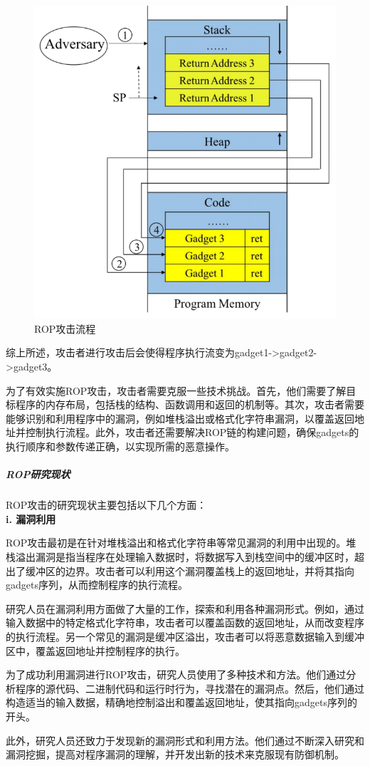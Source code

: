 \documentclass[UTF8,12pt,a4paper]{ctexart}
\numberwithin{figure}{section}
\begin{document}
\begin{figure}
    \centering
    \includegraphics[scale=0.35]{graph/ROP.png}
    \caption{ROP攻击流程}
    \label{ROP}
\end{figure}
综上所述，攻击者进行攻击后会使得程序执行流变为gadget1->gadget2->gadget3。

\par 为了有效实施ROP攻击，攻击者需要克服一些技术挑战。首先，他们需要了解目标程序的内存布局，包括栈的结构、函数调用和返回的机制等。其次，攻击者需要能够识别和利用程序中的漏洞，例如堆栈溢出或格式化字符串漏洞，以覆盖返回地址并控制执行流程。此外，攻击者还需要解决ROP链的构建问题，确保gadgets的执行顺序和参数传递正确，以实现所需的恶意操作。

\subparagraph{ROP研究现状}
ROP攻击的研究现状主要包括以下几个方面：\\
\textbf{i. 漏洞利用}
\par ROP攻击最初是在针对堆栈溢出和格式化字符串等常见漏洞的利用中出现的。堆栈溢出漏洞是指当程序在处理输入数据时，将数据写入到栈空间中的缓冲区时，超出了缓冲区的边界。攻击者可以利用这个漏洞覆盖栈上的返回地址，并将其指向gadgets序列，从而控制程序的执行流程。
\par 研究人员在漏洞利用方面做了大量的工作，探索和利用各种漏洞形式。例如，通过输入数据中的特定格式化字符串，攻击者可以覆盖函数的返回地址，从而改变程序的执行流程。另一个常见的漏洞是缓冲区溢出，攻击者可以将恶意数据输入到缓冲区中，覆盖返回地址并控制程序的执行。
\par 为了成功利用漏洞进行ROP攻击，研究人员使用了多种技术和方法。他们通过分析程序的源代码、二进制代码和运行时行为，寻找潜在的漏洞点。然后，他们通过构造适当的输入数据，精确地控制溢出和覆盖返回地址，使其指向gadgets序列的开头。
\par 此外，研究人员还致力于发现新的漏洞形式和利用方法。他们通过不断深入研究和漏洞挖掘，提高对程序漏洞的理解，并开发出新的技术来克服现有防御机制。\\
\end{document}
